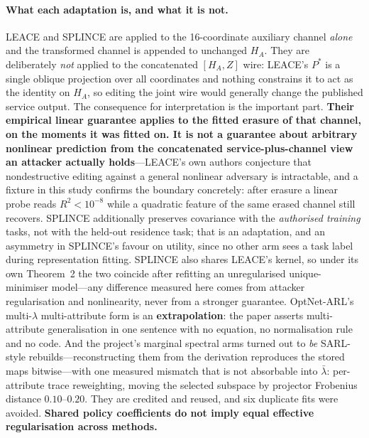 \documentclass[10pt]{article}
\begin{document}
\paragraph{What each adaptation is, and what it is not.} LEACE \citep{belrose2023leace} and SPLINCE
\citep{holstege2025splince} are applied to the 16-coordinate auxiliary channel \emph{alone} and the
transformed channel is appended to unchanged $H_A$. They are deliberately \emph{not} applied to the
concatenated $[H_A,Z]$ wire: LEACE's $P^\ast$ is a single oblique projection over all coordinates and
nothing constrains it to act as the identity on $H_A$, so editing the joint wire would generally
change the published service output. The consequence for interpretation is the important part.
\textbf{Their empirical linear guarantee applies to the fitted erasure of that channel, on the moments
it was fitted on. It is not a guarantee about arbitrary nonlinear prediction from the concatenated
service-plus-channel view an attacker actually holds}---LEACE's own authors conjecture that
nondestructive editing against a general nonlinear adversary is intractable, and a fixture in this
study confirms the boundary concretely: after erasure a linear probe reads $R^2<10^{-8}$ while a
quadratic feature of the same erased channel still recovers. SPLINCE additionally preserves covariance
with the \emph{authorised training} tasks, not with the held-out residence task; that is an
adaptation, and an asymmetry in SPLINCE's favour on utility, since no other arm sees a task label
during representation fitting. SPLINCE also shares LEACE's kernel, so under its own Theorem~2 the two
coincide after refitting an unregularised unique-minimiser model---any difference measured here comes
from attacker regularisation and nonlinearity, never from a stronger guarantee. OptNet-ARL's
multi-$\lambda$ multi-attribute form is an \textbf{extrapolation}: the paper asserts multi-attribute
generalisation in one sentence with no equation, no normalisation rule and no code. And the project's
marginal spectral arms turned out to \emph{be} SARL-style rebuilds---reconstructing them from the
derivation reproduces the stored maps bitwise---with one measured mismatch that is not absorbable into
$\bar\lambda$: per-attribute trace reweighting, moving the selected subspace by projector Frobenius
distance $0.10$--$0.20$. They are credited and reused, and six duplicate fits were avoided.
\textbf{Shared policy coefficients do not imply equal effective regularisation across methods.}

\begin{table}[t]
\centering\footnotesize

\caption{The same arms against the frozen neural channel $J$.
\noteExternalVsJ}
\label{tab:extJ}
\end{table}
\end{document}
